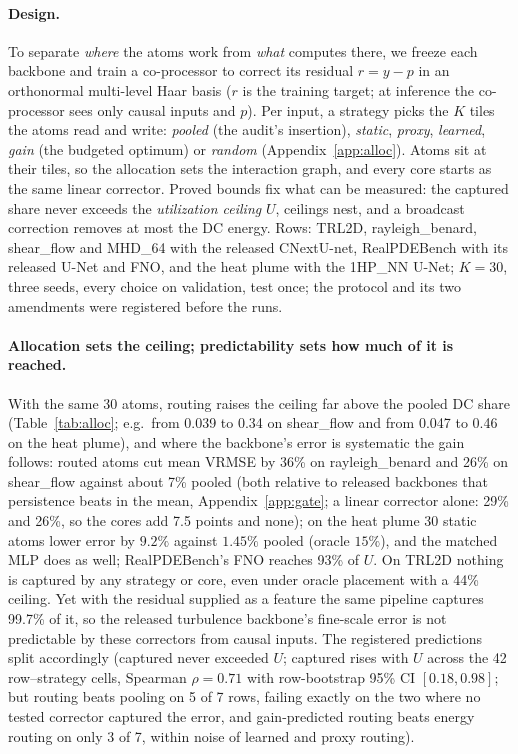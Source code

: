 \documentclass{article}
\newcommand{\AllocRows}{TRL2D, rayleigh\_benard, shear\_flow and MHD\_64 with the released CNextU-net, RealPDEBench with its released U-Net and FNO, and the heat plume with the 1HP\_NN U-Net}
\newcommand{\AllocCeilExample}{from 0.039 to 0.34 on shear\_flow and from 0.047 to 0.46 on the heat plume}
\newcommand{\AllocPelzerStatic}{$9.2\%$}
\newcommand{\AllocPelzerPooled}{$1.45\%$}
\newcommand{\AllocPelzerOracle}{$15\%$}
\newcommand{\AllocFNOeff}{93\%}
\newcommand{\AllocPreds}{captured never exceeded $U$; captured rises with $U$ across the 42 row--strategy cells, Spearman $\rho = 0.71$ with row-bootstrap 95\% CI $[0.18, 0.98]$; but routing beats pooling on 5 of 7 rows, failing exactly on the two where no tested corrector captured the error, and gain-predicted routing beats energy routing on only 3 of 7, within noise of learned and proxy routing}
\begin{document}
\paragraph{Design.} To separate \emph{where} the atoms work from \emph{what} computes there, we freeze each backbone and
train a co-processor to correct its residual $r = y - p$ in an orthonormal multi-level Haar basis ($r$ is the training target; at inference the co-processor sees only causal inputs and $p$). Per input, a strategy picks
the $K$ tiles the atoms read and write: \emph{pooled} (the audit's insertion), \emph{static}, \emph{proxy},
\emph{learned}, \emph{gain} (the budgeted optimum) or \emph{random}
(Appendix~\ref{app:alloc}). Atoms sit at their tiles, so the allocation sets the interaction graph, and every core
starts as the same linear corrector. Proved bounds fix what can be measured: the captured share never exceeds the \emph{utilization ceiling} $U$, ceilings nest, and a broadcast correction removes at most the DC energy. Rows: \AllocRows; $K=30$, three
seeds, every choice on validation, test once; the protocol and its two amendments were registered before the runs.

\paragraph{Allocation sets the ceiling; predictability sets how much of it is reached.} With the same 30 atoms,
routing raises the ceiling far above the pooled DC share (Table~\ref{tab:alloc}; e.g.\ \AllocCeilExample), and where
the backbone's error is systematic the gain follows: routed atoms cut mean VRMSE by 36\% on rayleigh\_benard and 26\% on
shear\_flow against about 7\% pooled (both relative to released backbones that persistence beats in the mean,
Appendix~\ref{app:gate}; a linear corrector alone: 29\% and 26\%, so the cores add 7.5 points and none); on the heat plume 30 static atoms lower error by \AllocPelzerStatic{} against
\AllocPelzerPooled{} pooled (oracle \AllocPelzerOracle), and the matched MLP does as well; RealPDEBench's FNO reaches \AllocFNOeff{} of $U$. On TRL2D
nothing is captured by any strategy or core, even under oracle placement with a 44\% ceiling. Yet with the residual
supplied as a feature the same pipeline captures 99.7\% of it, so the released turbulence backbone's fine-scale error is
not predictable by these correctors from causal inputs. The registered predictions split accordingly (\AllocPreds).
\end{document}

